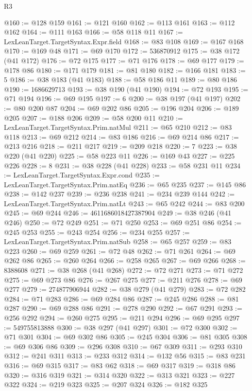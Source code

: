\begin{lexlean}{R3}
\begin{coremodule}
@160 := @128 @159
@161 := @121 @160
@162 := @113 @161
@163 := @112 @162
@164 := @111 @163
@166 := @58 @118 @11
@167 := LexLeanTarget.TargetSyntax.Expr.field
@168 := @83 @108
@169 := @167 @168
@170 := @169 @48
@171 := @69 @170
@172 := 536870912
@175 := @38 @172 (@41 @172)
@176 := @72 @175
@177 := @71 @176
@178 := @69 @177
@179 := @178 @86
@180 := @171 @179
@181 := @81 @180
@182 := @166 @181
@183 := 5
@186 := @38 @183 (@41 @183)
@188 := @58 @186 @11
@189 := @80 @186
@190 := 1686629713
@193 := @38 @190 (@41 @190)
@194 := @72 @193
@195 := @71 @194
@196 := @69 @195
@197 := 6
@200 := @38 @197 (@41 @197)
@202 := @80 @200 @87
@204 := @69 @202 @86
@205 := @196 @204
@206 := @189 @205
@207 := @188 @206
@209 := @58 @200 @11
@210 := LexLeanTarget.TargetSyntax.Prim.natMul
@211 := @65 @210
@212 := @83 @118
@213 := @69 @212
@214 := @83 @186
@216 := @69 @214 @86
@217 := @213 @216
@218 := @211 @217
@219 := @209 @218
@220 := 7
@223 := @38 @220 (@41 @220)
@225 := @58 @223 @11
@226 := @169 @43
@227 := @225 @226
@228 := 8
@231 := @38 @228 (@41 @228)
@233 := @58 @231 @11
@234 := LexLeanTarget.TargetSyntax.Expr.cond
@235 := LexLeanTarget.TargetSyntax.Prim.natEq
@236 := @65 @235
@237 := @145 @86
@238 := @142 @237
@239 := @236 @238
@241 := @234 @239 @144
@242 := LexLeanTarget.TargetSyntax.Prim.natLt
@243 := @65 @242
@244 := @83 @200
@245 := @69 @244
@246 := 4611686018427387904
@249 := @38 @246 (@41 @246)
@250 := @72 @249
@251 := @71 @250
@253 := @69 @251 @86
@254 := @245 @253
@255 := @243 @254
@256 := @234 @255
@257 := LexLeanTarget.TargetSyntax.Prim.natSub
@258 := @65 @257
@259 := @83 @223
@260 := @69 @259
@261 := @72 @48
@262 := @71 @261
@264 := @69 @262 @86
@265 := @260 @264
@266 := @258 @265
@267 := @69 @266
@268 := 8388608
@271 := @38 @268 (@41 @268)
@272 := @72 @271
@273 := @71 @272
@275 := @69 @273 @86
@276 := @267 @275
@277 := @211 @276
@278 := @69 @277
@279 := 274877906944
@282 := @38 @279 (@41 @279)
@283 := @72 @282
@284 := @71 @283
@286 := @69 @284 @86
@287 := @245 @286
@288 := @81 @287
@290 := @69 @288 @86
@291 := @278 @290
@292 := @67 @291
@293 := @256 @292
@294 := @260 @275
@295 := @211 @294
@296 := @69 @295
@297 := 549755813888
@300 := @38 @297 (@41 @297)
@301 := @72 @300
@302 := @71 @301
@304 := @69 @302 @86
@305 := @245 @304
@306 := @81 @305
@308 := @69 @306 @86
@309 := @296 @308
@310 := @67 @309
@311 := @293 @310
@312 := @241 @311
@313 := @233 @312
@314 := @132 @56
@315 := @83 @231
@316 := @69 @315
@317 := @83 @62
@318 := @69 @317
@319 := @318 @86
@320 := @316 @319
@321 := @314 @320
@322 := @313 @321
@323 := @227 @322
@324 := @219 @323
@325 := @207 @324
@326 := @182 @325

\end{coremodule}
\end{lexlean}

